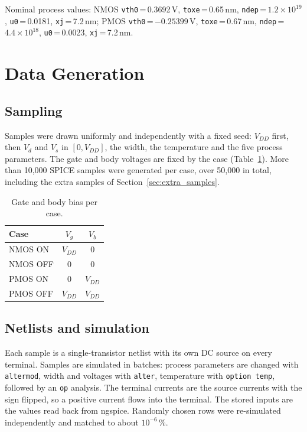 \documentclass[12pt]{article}
\begin{document}
Nominal process values: NMOS \texttt{vth0}\,=\,0.3692\,V, \texttt{toxe}\,=\,0.65\,nm,
\texttt{ndep}\,=\,$1.2\times10^{19}$, \texttt{u0}\,=\,0.0181, \texttt{xj}\,=\,7.2\,nm; PMOS
\texttt{vth0}\,=\,$-0.25399$\,V, \texttt{toxe}\,=\,0.67\,nm, \texttt{ndep}\,=\,$4.4\times10^{18}$,
\texttt{u0}\,=\,0.0023, \texttt{xj}\,=\,7.2\,nm.

\section{Data Generation}
\subsection{Sampling}
Samples were drawn uniformly and independently with a fixed seed: $V_{DD}$ first, then $V_d$ and
$V_s$ in $[0, V_{DD}]$, the width, the temperature and the five process parameters. The gate and
body voltages are fixed by the case (Table~\ref{tab:bias}). More than 10{,}000 SPICE samples were
generated per case, over 50{,}000 in total, including the extra samples of Section~\ref{sec:extra_samples}.

\begin{table}[H]
\centering
\begin{tabular}{lcc}
\hline
Case & $V_g$ & $V_b$ \\
\hline
NMOS ON  & $V_{DD}$ & 0 \\
NMOS OFF & 0 & 0 \\
PMOS ON  & 0 & $V_{DD}$ \\
PMOS OFF & $V_{DD}$ & $V_{DD}$ \\
\hline
\end{tabular}
\caption{Gate and body bias per case.}
\label{tab:bias}
\end{table}

\subsection{Netlists and simulation}
Each sample is a single-transistor netlist with its own DC source on every terminal. Samples are
simulated in batches: process parameters are changed with \texttt{altermod}, width and voltages
with \texttt{alter}, temperature with \texttt{option temp}, followed by an \texttt{op} analysis.
The terminal currents are the source currents with the sign flipped, so a positive current flows
into the terminal. The stored inputs are the values read back from ngspice. Randomly chosen rows
were re-simulated independently and matched to about $10^{-6}\,\%$.
\end{document}
